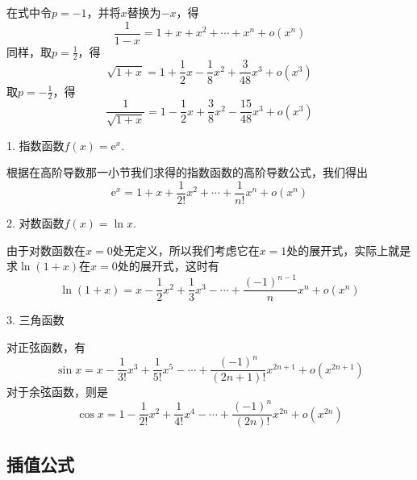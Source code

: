 在式中令$p=-1$，并将$x$替换为$-x$，得
\[ \frac{1}{1-x} = 1+x+x^2 + \cdots + x^n + o(x^n) \]
同样，取$p=\frac{1}{2}$，得
\[ \sqrt{1+x} = 1+\frac{1}{2}x-\frac{1}{8}x^2+\frac{3}{48}x^3 + o(x^3) \]
取$p=-\frac{1}{2}$，得
\[ \frac{1}{\sqrt{1+x}} = 1-\frac{1}{2}x+\frac{3}{8}x^2 -\frac{15}{48}x^3 + o(x^3) \]

1. 指数函数$f(x)=\mathrm{e}^x$.

根据在高阶导数那一小节我们求得的指数函数的高阶导数公式，我们得出
\[ \mathrm{e}^x = 1+x+\frac{1}{2!}x^2 + \cdots + \frac{1}{n!}x^n + o(x^n) \]

2. 对数函数$f(x)=\ln{x}$.

由于对数函数在$x=0$处无定义，所以我们考虑它在$x=1$处的展开式，实际上就是求$\ln{(1+x)}$在$x=0$处的展开式，这时有
\[ \ln{(1+x)} = x - \frac{1}{2} x^2 + \frac{1}{3} x^3 - \cdots + \frac{(-1)^{n-1}}{n}x^n + o(x^n) \]

3. 三角函数

对正弦函数，有
\[ \sin{x} = x - \frac{1}{3!}x^3 + \frac{1}{5!} x^5 - \cdots + \frac{(-1)^n}{(2n+1)!}x^{2n+1} + o(x^{2n+1}) \]
对于余弦函数，则是
\[ \cos{x} = 1 - \frac{1}{2!}x^2 + \frac{1}{4!}x^4 - \cdots + \frac{(-1)^n}{(2n)!}x^{2n} + o(x^{2n}) \]

\subsection{插值公式}
\label{sec:interpolation-formula}




